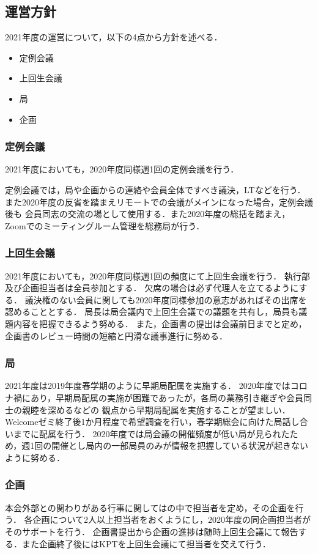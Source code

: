 \subsection*{運営方針}


2021年度の運営について，以下の4点から方針を述べる．
\begin{itemize}
    \item 定例会議
    \item 上回生会議
    \item 局
    \item 企画
\end{itemize}

\subsubsection*{定例会議}
2021年度においても，2020年度同様週1回の定例会議を行う．

定例会議では，局や企画からの連絡や会員全体ですべき議決，LTなどを行う．
また2020年度の反省を踏まえリモートでの会議がメインになった場合，定例会議後も
会員同志の交流の場として使用する．また2020年度の総括を踏まえ，
Zoomでのミーティングルーム管理を総務局が行う．

\subsubsection*{上回生会議}
2021年度においても，2020年度同様週1回の頻度にて上回生会議を行う．
執行部及び企画担当者は全員参加とする．
欠席の場合は必ず代理人を立てるようにする．
議決権のない会員に関しても2020年度同様参加の意志があればその出席を認めることとする．
局長は局会議内で上回生会議での議題を共有し，局員も議題内容を把握できるよう努める．
また，企画書の提出は会議前日までと定め，企画書のレビュー時間の短縮と円滑な議事進行に努める．

\subsubsection*{局}
2021年度は2019年度春学期のように早期局配属を実施する．
2020年度ではコロナ禍にあり，早期局配属の実施が困難であったが，各局の業務引き継ぎや会員同士の親睦を深めるなどの
観点から早期局配属を実施することが望ましい．
Welcomeゼミ終了後1か月程度で希望調査を行い，春学期総会に向けた局話し合いまでに配属を行う．
2020年度では局会議の開催頻度が低い局が見られたため，週1回の開催とし局内の一部局員のみが情報を把握している状況が起きないように努める．

\subsubsection*{企画}
本会外部との関わりがある行事に関しては\secondGrade{}の中で担当者を定め，その企画を行う．
各企画について2人以上担当者をおくようにし，2020年度の同企画担当者がそのサポートを行う．
企画書提出から企画の進捗は随時上回生会議にて報告する．また企画終了後にはKPTを上回生会議にて担当者を交えて行う．
